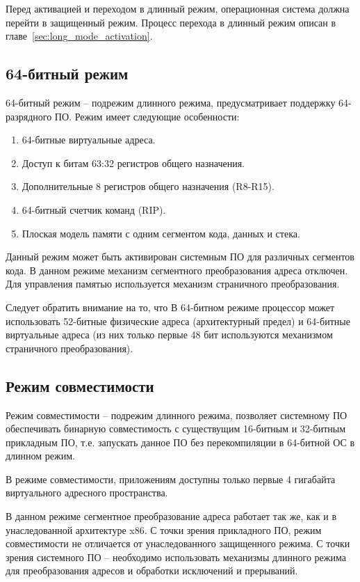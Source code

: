 Перед активацией и переходом в длинный режим, операционная система должна перейти в
защищенный режим. Процесс перехода в длинный режим описан в главе~\ref{sec:long_mode_activation}.

\subsection{64-битный режим}
64-битный режим -- подрежим длинного режима, предусматривает поддержку 64-разрядного
ПО. Режим имеет следующие особенности:
\begin{enumerate}[1.]
\item 64-битные виртуальные адреса.
\item Доступ к битам 63:32 регистров общего назначения.
\item Дополнительные 8 регистров общего назначения (R8-R15).
\item 64-битный счетчик команд (RIP).
\item Плоская модель памяти с одним сегментом кода, данных и стека.
\end{enumerate}

Данный режим может быть активирован системным ПО для различных сегментов кода. В данном режиме
механизм сегментного преобразования адреса отключен. Для управления памятью используется
механизм страничного преобразования.

Следует обратить внимание на то, что В 64-битном режиме процессор может использовать
52-битные физические адреса (архитектурный предел) и 64-битные виртуальные адреса (из них
только первые 48 бит используются механизмом страничного преобразования).

\subsection{Режим совместимости}
Режим совместимости -- подрежим длинного режима, позволяет системному ПО обеспечивать
бинарную совместимость с существущим 16-битным и 32-битным прикладным ПО,
т.е. запускать данное ПО без перекомпиляции в 64-битной ОС в длинном режим.

В режиме совместимости, приложениям доступны только первые 4 гигабайта виртуального адресного пространства.

В данном режиме сегментное преобразование адреса работает так же, как и в унаследованной
архитектуре x86. С точки зрения прикладного ПО, режим совместимости не отличается от унаследованного
защищенного режима. С точки зрения системного ПО -- необходимо использовать механизмы длинного режима для
преобразования адресов и обработки исключений и прерываний.

